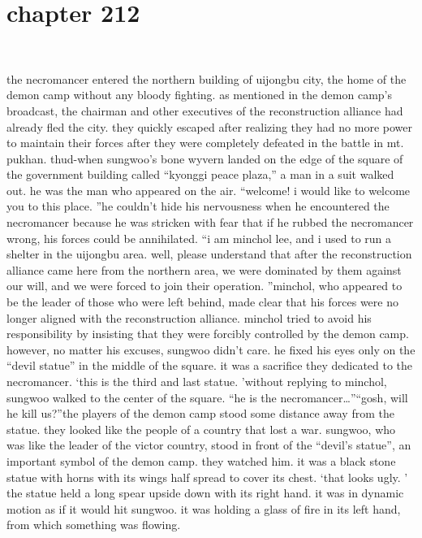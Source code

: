 \section{chapter 212}

                             




the necromancer entered the northern building of uijongbu city, the home of the demon camp without any bloody fighting.
as mentioned in the demon camp’s broadcast, the chairman and other executives of the reconstruction alliance had already fled the city.
 they quickly escaped after realizing they had no more power to maintain their forces after they were completely defeated in the battle in mt.
 pukhan.
thud-when sungwoo’s bone wyvern landed on the edge of the square of the government building called “kyonggi peace plaza,” a man in a suit walked out.
 he was the man who appeared on the air.
“welcome! i would like to welcome you to this place.
”he couldn’t hide his nervousness when he encountered the necromancer because he was stricken with fear that if he rubbed the necromancer wrong, his forces could be annihilated.
“i am minchol lee, and i used to run a shelter in the uijongbu area.
 well, please understand that after the reconstruction alliance came here from the northern area, we were dominated by them against our will, and we were forced to join their operation.
”minchol, who appeared to be the leader of those who were left behind, made clear that his forces were no longer aligned with the reconstruction alliance.
 minchol tried to avoid his responsibility by insisting that they were forcibly controlled by the demon camp.
however, no matter his excuses, sungwoo didn’t care.
 he fixed his eyes only on the “devil statue” in the middle of the square.
it was a sacrifice they dedicated to the necromancer.
‘this is the third and last statue.
’without replying to minchol, sungwoo walked to the center of the square.
“he is the necromancer…”“gosh, will he kill us?”the players of the demon camp stood some distance away from the statue.
 they looked like the people of a country that lost a war.
sungwoo, who was like the leader of the victor country, stood in front of the “devil’s statue”, an important symbol of the demon camp.
 they watched him.
it was a black stone statue with horns with its wings half spread to cover its chest.
‘that looks ugly.
’
the statue held a long spear upside down with its right hand.
 it was in dynamic motion as if it would hit sungwoo.
it was holding a glass of fire in its left hand, from which something was flowing.
